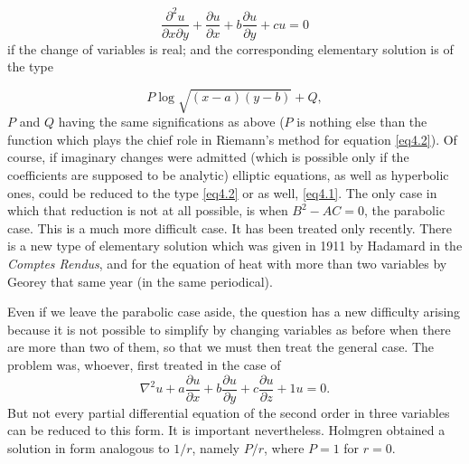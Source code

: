 \documentclass[12pt,oneside]{book}
\begin{document}
\begin{equation}
    \frac{\partial^2u}{\partial x\partial y}+\frac{\partial u}{\partial x}+b\frac{\partial u}{\partial y}+cu=0
    \label{eq4.2}
\end{equation}
if the change of variables is real; and the corresponding elementary solution is
of the type

$$P\log\sqrt{(x-a)(y-b)}+Q,$$
$P$ and $Q$ having the same significations as above ($P$ is nothing else than
the function which plays the chief role in Riemann's method for equation
\eqref{eq4.2}). Of course, if imaginary changes were admitted (which is possible
only if the coefficients are supposed to be analytic) elliptic equations, as
well as hyperbolic ones, could be reduced to the type \eqref{eq4.2} or as well,
\eqref{eq4.1}. The only case in which that reduction is not at all possible, is
when $B^2-AC=0$, the parabolic case. This is a much more difficult case. It has
been treated only recently. There is a new type of elementary solution which was
given in 1911 by Hadamard in the \textit{Comptes Rendus}, and for the equation
of heat with more than two variables by Georey that same year (in the same
periodical). \par

Even if we leave the parabolic case aside, the question has a new difficulty
arising because it is not possible to simplify by changing variables as before
when there are more than two of them, so that we must then treat the general
case. The problem was, whoever, first treated in the case of
$$\nabla^2u+a\frac{\partial u}{\partial x}+b\frac{\partial u}{\partial
y}+c\frac{\partial u}{\partial z}+1u=0.$$ But not every partial differential
equation of the second order in three variables can be reduced to this form. It
is important nevertheless. Holmgren obtained a solution in form analogous to
$1/r$, namely $P/r$, where $P=1$ for $r=0$. \par
\end{document}
